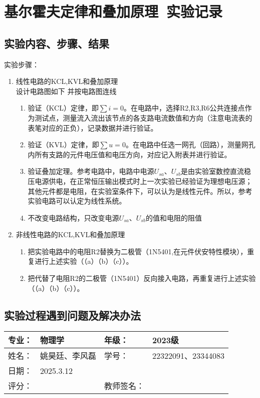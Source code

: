 \documentclass[dvipsnames, svgnames,a4paper,11pt]{article}
\newcommand{\exname}{基尔霍夫定律和叠加原理}%
\begin{document}
\section{\exname\ \textbf{实验记录}}
\subsection{实验内容、步骤、结果}
实验步骤：
\begin{enumerate}
	\item 线性电路的KCL,KVL和叠加原理\\
	设计电路图如下
	\vspace{10cm}
	并按电路图连线
	\begin{enumerate}
		\item 验证（KCL）定律，即$\sum i=0$。在电路中，选择R2,R3,R6公共连接点作为测试点，测量流入流出该节点的各支路电流数值和方向（注意电流表的表笔对应的正负），记录数据并进行验证。
		\item 验证（KVL）定律，即$\sum u=0$。在电路中任选一网孔（回路），测量网孔内所有支路的元件电压值和电压方向，对应记入附表并进行验证。
		\item 验证叠加定理。参考电路中，电路中电源$U_{sa}$、$U_{sb}$是由实验室数控直流稳压电源供电，在正常恒压输出模式时上一次实验已经验证为理想电压源；其他元件都是电阻，在实验室条件下，可以认为是线性元件。所以，参考实验电路可以认定为线性系统。
		\item 不改变电路结构，只改变电源$U_{sa}$、$U_{sb}$的值和电阻的阻值
	\end{enumerate}
	\item 非线性电路的KCL,KVL和叠加原理
	\begin{enumerate}
		\item 把实验电路中的电阻R2替换为二极管（1N5401,在元件伏安特性模块），重复进行上述实验（（a）（b）（c））。
		\item 把代替了电阻R2的二极管（1N5401）反向接入电路，再重复进行上述实验（（a）（b）（c））。
	\end{enumerate}
\end{enumerate}
\newpage
\vspace*{\fill}
\subsection{实验过程遇到问题及解决办法}
\vspace*{\fill}
\clearpage
{}
\begin{table}
	\renewcommand\arraystretch{1.7}
	\begin{tabularx}{\textwidth}{|X|X|X|X|}
	\hline
	专业：& 物理学 &年级：& 2023级\\
	\hline
	姓名：& 姚昊廷、李风磊 & 学号：&22322091、23344083\\
	\hline
    日期：&2025.3.12 &  &\\
	\hline
	评分：&&教师签名：&\\
	\hline
	\end{tabularx}
\end{table}
\end{document}

